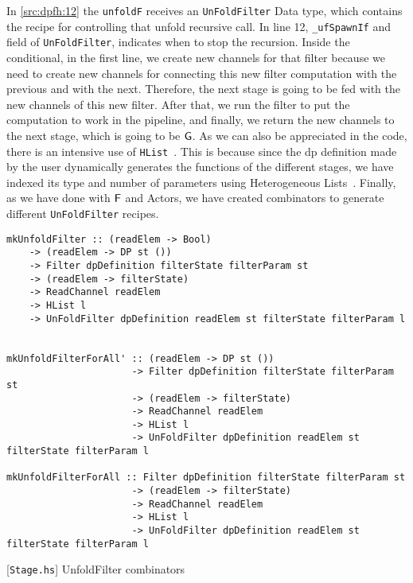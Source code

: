 In \autoref{src:dpfh:12} the \texttt{unfoldF} receives an \texttt{UnFoldFilter} Data type, which contains the recipe for controlling that unfold recursive call. 
In line 12, \texttt{_ufSpawnIf} and field of \texttt{UnFoldFilter}, indicates when to stop the recursion. 
Inside the conditional, in the first line, we create new channels for that filter because we need to create new channels for connecting this new filter computation with the previous and with the next. 
Therefore, the next stage is going to be fed with the new channels of this new filter. After that, we run the filter to put the computation 
to work in the pipeline, and finally, we return the new channels to the next stage, which is going to be $\mathsf{G}$.
As we can also be appreciated in the code, there is an intensive use of \texttt{HList}~\cite{hlist}. This is because since the \acrshort{dp}
definition made by the user dynamically generates the functions of the different stages, we have indexed its type and number of parameters
using Heterogeneous Lists~\cite{hlist}.
Finally, as we have done with $\mathsf{F}$ and Actors, we have created combinators to generate different \texttt{UnFoldFilter} recipes. 

\begin{listing}[H]
  \begin{verbatim}
mkUnfoldFilter :: (readElem -> Bool) 
    -> (readElem -> DP st ()) 
    -> Filter dpDefinition filterState filterParam st 
    -> (readElem -> filterState)
    -> ReadChannel readElem
    -> HList l 
    -> UnFoldFilter dpDefinition readElem st filterState filterParam l


mkUnfoldFilterForAll' :: (readElem -> DP st ())
                      -> Filter dpDefinition filterState filterParam st
                      -> (readElem -> filterState)
                      -> ReadChannel readElem
                      -> HList l
                      -> UnFoldFilter dpDefinition readElem st filterState filterParam l

mkUnfoldFilterForAll :: Filter dpDefinition filterState filterParam st
                      -> (readElem -> filterState)
                      -> ReadChannel readElem
                      -> HList l
                      -> UnFoldFilter dpDefinition readElem st filterState filterParam l
   \end{verbatim}
  \caption{[\texttt{Stage.hs}] UnfoldFilter combinators}
  \label{src:dpfh:13}
\end{listing}

